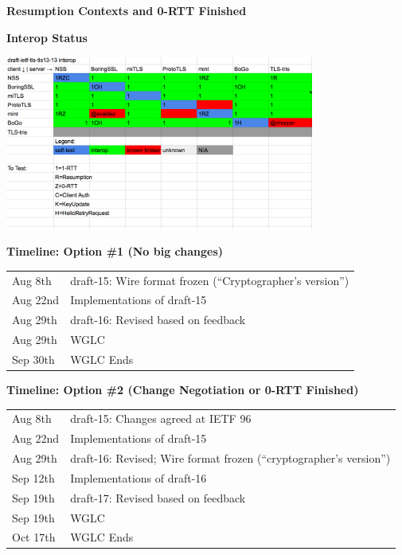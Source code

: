 \documentclass[helvetica]{seminar}
\newcommand{\heading}[1]{%
  \begin{center} 
    \large\bf 
    #1 
  \end{center} 
  \vspace{.4 in}}
\begin{document}
\begin{slide}
\heading{Resumption Contexts and 0-RTT Finished}

\end{slide}



\begin{slide}
\heading{Interop Status}

\includegraphics[width=4in]{interop-matrix}

\end{slide}


\begin{slide}
\heading{Timeline: Option \#1 (No big changes)}

\begin{tabular}{l l}
Aug 8th & draft-15: Wire format frozen (``Cryptographer's version'') \\
Aug 22nd & Implementations of draft-15 \\
Aug 29th & draft-16: Revised based on feedback \\
Aug 29th & WGLC \\
Sep 30th & WGLC Ends \\
\end{tabular}

\end{slide}


\begin{slide}
\heading{Timeline: Option \#2 (Change Negotiation or 0-RTT Finished)}

\begin{tabular}{l l}
Aug 8th & draft-15: Changes agreed at IETF 96 \\
Aug 22nd & Implementations of draft-15 \\
Aug 29th & draft-16: Revised; Wire format frozen (``cryptographer's version'')\\
Sep 12th & Implementations of draft-16 \\
Sep 19th & draft-17: Revised based on feedback \\
Sep 19th & WGLC \\
Oct 17th & WGLC Ends \\
\end{tabular}

\end{slide}
\end{document}
